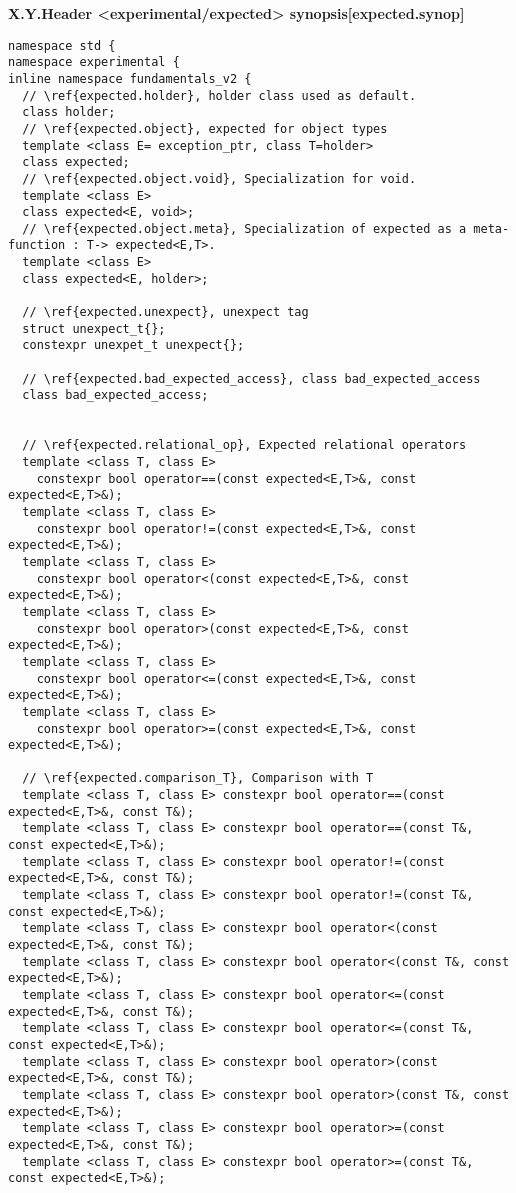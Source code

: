 \documentclass[a4paper,10pt]{article}
\newcounter{countWordingSubSec}
\renewcommand{\thecountWordingSubSec}{X.Y.\arabic{countWordingSubSec}}
\newcommand{\wordingSubSec}[2]{\vspace{15pt}
\refstepcounter{countWordingSubSec}
\noindent
{\textbf{\thecountWordingSubSec\quad #1\hfill\textbf{[#2]}}}
\label{#2}
\vspace{7pt}
}
\begin{document}
\wordingSubSec{Header <experimental/expected> synopsis}{expected.synop}

\begin{lstlisting}
namespace std {
namespace experimental {
inline namespace fundamentals_v2 {
  // \ref{expected.holder}, holder class used as default.  
  class holder;
  // \ref{expected.object}, expected for object types  
  template <class E= exception_ptr, class T=holder>
  class expected;
  // \ref{expected.object.void}, Specialization for void.  
  template <class E>
  class expected<E, void>;
  // \ref{expected.object.meta}, Specialization of expected as a meta-function : T-> expected<E,T>.  
  template <class E>
  class expected<E, holder>;
   
  // \ref{expected.unexpect}, unexpect tag
  struct unexpect_t{};
  constexpr unexpet_t unexpect{};
   
  // \ref{expected.bad_expected_access}, class bad_expected_access
  class bad_expected_access;
 
  
  // \ref{expected.relational_op}, Expected relational operators
  template <class T, class E>
    constexpr bool operator==(const expected<E,T>&, const expected<E,T>&);
  template <class T, class E>
    constexpr bool operator!=(const expected<E,T>&, const expected<E,T>&);
  template <class T, class E>
    constexpr bool operator<(const expected<E,T>&, const expected<E,T>&);
  template <class T, class E>
    constexpr bool operator>(const expected<E,T>&, const expected<E,T>&);
  template <class T, class E>
    constexpr bool operator<=(const expected<E,T>&, const expected<E,T>&);
  template <class T, class E>
    constexpr bool operator>=(const expected<E,T>&, const expected<E,T>&);
    
  // \ref{expected.comparison_T}, Comparison with T
  template <class T, class E> constexpr bool operator==(const expected<E,T>&, const T&);
  template <class T, class E> constexpr bool operator==(const T&, const expected<E,T>&);
  template <class T, class E> constexpr bool operator!=(const expected<E,T>&, const T&);
  template <class T, class E> constexpr bool operator!=(const T&, const expected<E,T>&);
  template <class T, class E> constexpr bool operator<(const expected<E,T>&, const T&);
  template <class T, class E> constexpr bool operator<(const T&, const expected<E,T>&);
  template <class T, class E> constexpr bool operator<=(const expected<E,T>&, const T&);
  template <class T, class E> constexpr bool operator<=(const T&, const expected<E,T>&);
  template <class T, class E> constexpr bool operator>(const expected<E,T>&, const T&);
  template <class T, class E> constexpr bool operator>(const T&, const expected<E,T>&);
  template <class T, class E> constexpr bool operator>=(const expected<E,T>&, const T&);
  template <class T, class E> constexpr bool operator>=(const T&, const expected<E,T>&);


\end{lstlisting}
\end{document}
